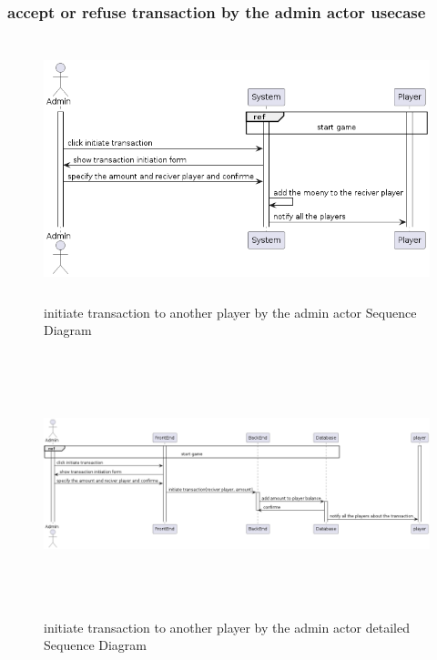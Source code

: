 \documentclass{article}
\begin{document}
\subsubsection{accept or refuse transaction by the admin actor usecase}
 \begin{figure}[H]
	 \centering
	 \includegraphics[height=3in]{../thesis_tex/assets/diagrams/initiate_transaction_to_another_player_SD.png}
	 \caption{initiate transaction to another player by the admin actor Sequence Diagram}
\end{figure}

 \begin{figure}[H]
	 \centering
	 \includegraphics[height=3in,width=6in]{../thesis_tex/assets/diagrams/initiate_transaction_to_another_player_detailedSD.png}
	 \caption{initiate transaction to another player by the admin actor detailed Sequence Diagram}
\end{figure}
\end{document}
